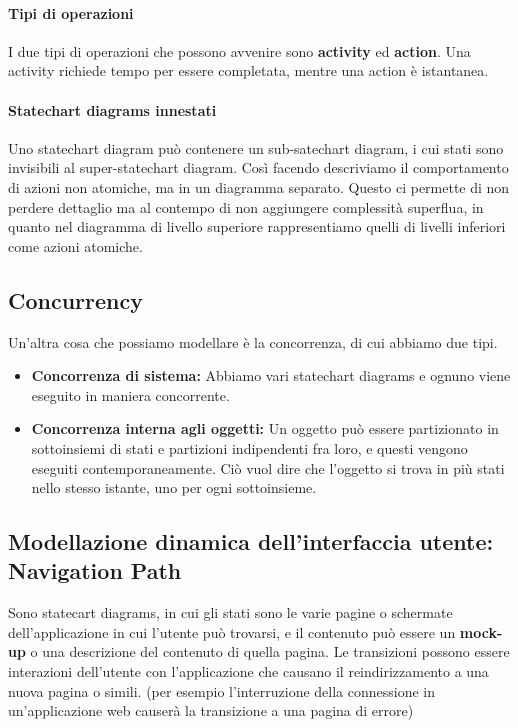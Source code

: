         \paragraph{Tipi di operazioni} I due tipi di operazioni che possono avvenire sono \textbf{activity} ed \textbf{action}. Una activity richiede tempo per essere completata, mentre una action è istantanea.
        
        \paragraph{Statechart diagrams innestati} Uno statechart diagram può contenere un sub-satechart diagram, i cui stati sono invisibili al super-statechart diagram. Così facendo descriviamo il comportamento di azioni non atomiche, ma in un diagramma separato. Questo ci permette di non perdere dettaglio ma al contempo di non aggiungere complessità superflua, in quanto nel diagramma di livello superiore rappresentiamo quelli di livelli inferiori come azioni atomiche.
        
    \subsection{Concurrency}
        Un'altra cosa che possiamo modellare è la concorrenza, di cui abbiamo due tipi.
        \begin{itemize}
            \item \textbf{Concorrenza di sistema:} Abbiamo vari statechart diagrams e ognuno viene eseguito in maniera concorrente.
            \item \textbf{Concorrenza interna agli oggetti:} Un oggetto può essere partizionato in sottoinsiemi di stati e partizioni indipendenti fra loro, e questi vengono eseguiti contemporaneamente. Ciò vuol dire che l'oggetto si trova in più stati nello stesso istante, uno per ogni sottoinsieme.
        \end{itemize}
        
    \subsection{Modellazione dinamica dell'interfaccia utente: Navigation Path}
        Sono statecart diagrams, in cui gli stati sono le varie pagine o schermate dell'applicazione in cui l'utente può trovarsi, e il contenuto può essere un \textbf{mock-up} o una descrizione del contenuto di quella pagina. Le transizioni possono essere interazioni dell'utente con l'applicazione che causano il reindirizzamento a una nuova pagina o simili. (per esempio l'interruzione della connessione in un'applicazione web causerà la transizione a una pagina di errore)